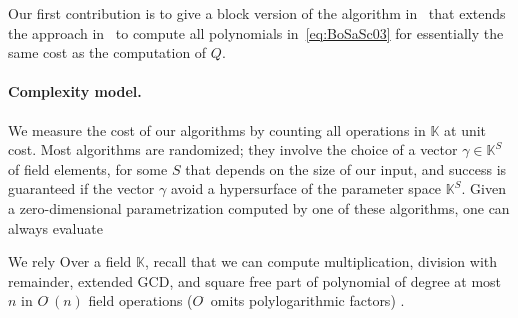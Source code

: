 \documentclass[12pt]{article}
\def\K{\mathbb{K}}
\def\K {\ensuremath{\mathbb{K}}}
\begin{document}
Our first contribution is to give a block version of
the algorithm in~\cite{BoSaSc03} that extends the approach
in~\cite{Steel15} to compute all polynomials in~\eqref{eq:BoSaSc03}
for essentially the same cost as the computation of $Q$.


\paragraph{Complexity model.}
We measure the cost of our algorithms by counting all operations in
$\K$ at unit cost. Most algorithms are randomized; they involve the
choice of a vector $\gamma \in \K^S$ of field elements, for some $S$
that depends on the size of our input, and success is guaranteed if
the vector $\gamma$ avoid a hypersurface of the parameter space
$\K^S$. Given a zero-dimensional parametrization computed by one of
these algorithms, one can always evaluate 

We rely 
Over a field $\mathbb{K}$, recall that we can compute multiplication,
division with remainder, extended GCD, and square free part of
polynomial of degree at most $n$ in $O^{\tilde{~}}(n)$ field
operations ($O^{\tilde{~}}$ omits polylogarithmic factors)
\cite{GaGe13}.




\end{document}
